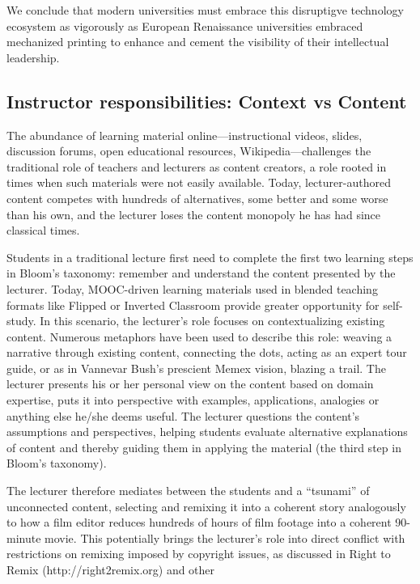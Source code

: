 We conclude that modern universities must embrace this disruptigve
technology ecosystem as vigorously as European Renaissance universities
embraced mechanized printing to enhance and cement the
visibility of their intellectual leadership.


\subsection{Instructor responsibilities: Context vs Content}

The abundance of learning material online---instructional videos,
slides, discussion forums, open educational resources,
Wikipedia---challenges the traditional role of teachers and lecturers as
content creators, a role rooted in times when such materials were not
easily available.
Today, lecturer-authored content competes with hundreds of alternatives,
some better and some worse than his own, and the lecturer
loses the content monopoly he has had since classical times.

Students in a traditional lecture first need to complete the first two
learning steps in Bloom's taxonomy: remember and understand the content
presented by the lecturer.
Today, MOOC-driven learning materials used in blended teaching formats
like Flipped or Inverted Classroom provide greater opportunity for
self-study.
In this scenario, the lecturer's role focuses on contextualizing
existing content.
Numerous metaphors have been used to describe this role: weaving a
narrative through existing content, connecting the dots, acting as an
expert tour guide, or as in Vannevar Bush's prescient Memex vision,
blazing a trail.
The lecturer presents his or her personal view on the content based on
domain expertise, puts it into perspective with examples, applications,
analogies or anything else he/she deems useful. The lecturer questions
the content's assumptions and perspectives, helping students evaluate
alternative explanations of content and thereby guiding them in applying
the material (the third step in Bloom’s taxonomy).

The lecturer therefore mediates between  the students and
a ``tsunami'' of unconnected content, selecting 
and remixing it into  a coherent story analogously to how
a film editor reduces hundreds of hours of film footage into a coherent
90-minute movie.
This potentially brings the lecturer's role into direct conflict
with restrictions on remixing imposed by copyright issues, as
discussed in Right to Remix (http://right2remix.org) and other

